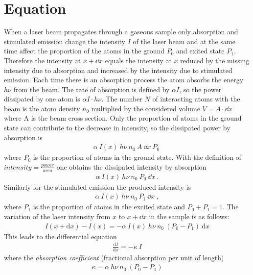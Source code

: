 \section{Equation} %
When a laser beam propagates through a gaseous sample only absorption and stimulated
emission change the intensity \(I\) of the laser beam and at the same time affect 
the proportion of the atoms in the ground \(P_0\) and exited state \(P_1\). 
Therefore the intensity at \(x+\dd x\) equals the intensity at \(x\) reduced by 
the missing intensity due to absorption and increased by the intensity due to 
stimulated emission. Each time there is an absorption process the atom absorbs 
the energy \(h\nu \) from the beam. The rate of absorption is defined by 
\(\alpha I \), so the power dissipated by one atom is \(\alpha I \cdot h\nu \). The number \(N\) of interacting
atoms with the beam is the atom density \(n_0\) multiplied by the considered volume
\(V = A \cdot \dd x \) where A is the beam cross section. Only the proportion of atoms in the 
ground state can contribute to the decrease in intensity, so the dissipated power
by absorption is
\begin{align}
    \alpha~I(x) ~ h\nu ~ n_0 ~ A ~ \dd x ~ P_0 ~ 
\end{align}
where \(P_0\) is the proportion of atoms in the ground state.
With the definition of \( intensity = \frac{power}{area}\) one obtains the dissipated
intensity by absorption 
\begin{align}
    \alpha~I(x) ~ h\nu ~ n_0 ~ P_0 ~ \dd x ~. 
\end{align}
Similarly for the stimulated emission the produced intensity is
\begin{align}
    \alpha~I(x) ~ h\nu ~ n_0 ~ P_1 ~ \dd x ~, 
\end{align}
where \(P_1\) is the proportion of atoms in the excited state and \(P_0+P_1 = 1\).
The variation of the laser intensity from \(x\) to
\(x+\dd x\) in the sample is as follows:
\begin{align} \label{eq:Int}
    I(x+\mathrm{d}x)-I(x) = - \alpha~I(x) ~ h\nu ~ n_0 ~ (P_0-P_1)~\mathrm{d}x 
\end{align}
This leads to the differential equation
\begin{align}\label{eq:diff_eq}
    \frac{ \mathrm{d}I }{ \mathrm{d}x } = -\kappa ~ I
\end{align}
where the \textit{absorption coefficient} (fractional absorption per unit of length)
\begin{align}\label{eq:kappa}
    \kappa = \alpha ~ h\nu  ~ n_0 ~ (P_0-P_1)
\end{align}

